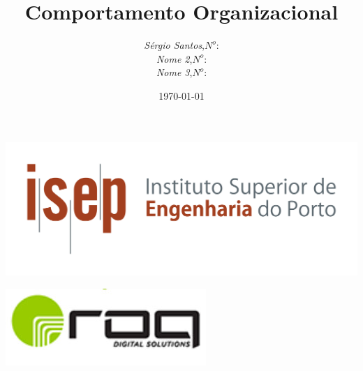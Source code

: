 \begin{minipage}{\linewidth}

\title{Comportamento Organizacional}
\author{
\emph{S\'{e}rgio Santos},\;$N^o$: \\
\emph{Nome 2},\;$N^o$:\\
\emph{Nome 3},\;$N^o$:\\
}
\date{\today}

\begin{titlepage}
\includegraphics[scale=0.60]{./image/capa/ISEP_marca_cor_grande.png}
\maketitle
\vspace{8cm}
\begin{flushleft}
\includegraphics[scale=0.50]{./image/ROQ/ROQ.jpg}
\end{flushleft}
\end{titlepage}

\end{minipage}

